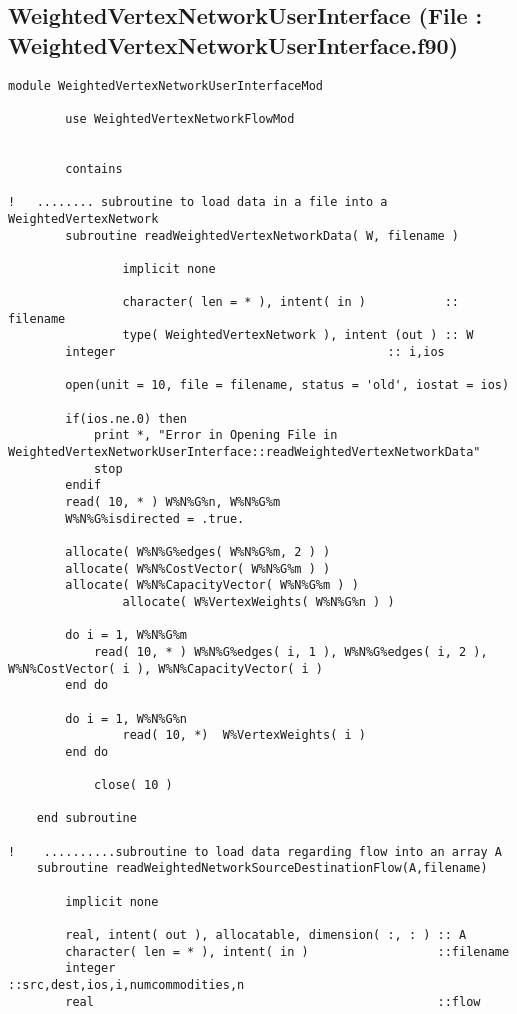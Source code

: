 \documentclass[10pt,a4paper,margin = 1.25cm]{article}
\begin{document}
\subsection*{WeightedVertexNetworkUserInterface (File : WeightedVertexNetworkUserInterface.f90) }
\begin{lstlisting}
module WeightedVertexNetworkUserInterfaceMod

		use WeightedVertexNetworkFlowMod
		
		
		contains
		
!   ........ subroutine to load data in a file into a WeightedVertexNetwork		
		subroutine readWeightedVertexNetworkData( W, filename )
				
				implicit none
				
				character( len = * ), intent( in )           :: filename
				type( WeightedVertexNetwork ), intent (out ) :: W
        integer                                      :: i,ios
        
        open(unit = 10, file = filename, status = 'old', iostat = ios)
        
        if(ios.ne.0) then
            print *, "Error in Opening File in WeightedVertexNetworkUserInterface::readWeightedVertexNetworkData"
            stop
        endif
        read( 10, * ) W%N%G%n, W%N%G%m
        W%N%G%isdirected = .true.
        
        allocate( W%N%G%edges( W%N%G%m, 2 ) )
        allocate( W%N%CostVector( W%N%G%m ) )
        allocate( W%N%CapacityVector( W%N%G%m ) )   
				allocate( W%VertexWeights( W%N%G%n ) )
				
        do i = 1, W%N%G%m
            read( 10, * ) W%N%G%edges( i, 1 ), W%N%G%edges( i, 2 ), W%N%CostVector( i ), W%N%CapacityVector( i ) 
        end do
        
        do i = 1, W%N%G%n
        		read( 10, *)  W%VertexWeights( i )
        end do
    		
    		close( 10 )
    		
    end subroutine
    
!    ..........subroutine to load data regarding flow into an array A    
    subroutine readWeightedNetworkSourceDestinationFlow(A,filename)
        
        implicit none

        real, intent( out ), allocatable, dimension( :, : ) :: A
        character( len = * ), intent( in )                  ::filename
        integer                                             ::src,dest,ios,i,numcommodities,n
        real                                                ::flow
        

\end{lstlisting}
\end{document}
